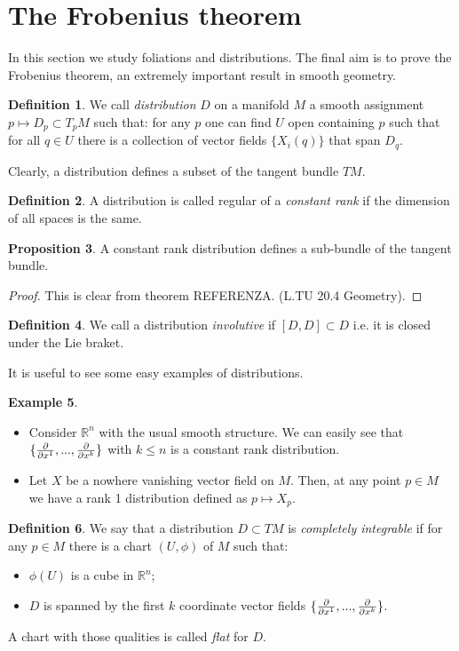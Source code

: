 \documentclass[12pt,a4paper]{report}
\theoremstyle{definition}
\newtheorem{Def}{Definition}[chapter]
\theoremstyle{Theorem}
\newtheorem{Prop}[Def]{Proposition}
\theoremstyle{definition}
\newtheorem{Ex}[Def]{Example}
\theoremstyle{definition}
\begin{document}
		\section{The Frobenius theorem}
		In this section we study foliations and distributions. The final aim is to prove the Frobenius theorem, an extremely important result in smooth geometry.
		\begin{Def}
			We call \textit{distribution} $D$ on a manifold $M$ a smooth assignment $p\mapsto D_p\subset T_pM$ such that: for any $p$ one can find $U$ open containing $p$ such that for all $q\in U$ there is a collection of vector fields $\{X_i(q)\}$ that span $D_q$.
		\end{Def}
		Clearly, a distribution defines a subset of the tangent bundle $TM$.
		\begin{Def}
			A distribution is called regular of a \textit{constant rank} if the dimension of all spaces is the same. 
		\end{Def}
		\begin{Prop}
			A constant rank distribution defines a sub-bundle of the tangent bundle.
		\end{Prop}
		\begin{proof}
			This is clear from theorem REFERENZA. (L.TU 20.4 Geometry).
		\end{proof}
		\begin{Def}
			We call a distribution \textit{involutive} if $[D,D]\subset D$ i.e. it is closed under the Lie braket.
		\end{Def}
		It is useful to see some easy examples of distributions.
		\begin{Ex}
			\begin{itemize}
				\item Consider $\mathbb{R}^n$ with the usual smooth structure. We can easily see that $\{{\partial\over \partial x^1},...,{\partial\over \partial x^k}\}$ with $k\leq n$ is a constant rank distribution.
				\item Let $X$ be a nowhere vanishing vector field on $M$. Then, at any point $p\in M$ we have a rank 1 distribution defined as $p\mapsto X_p$.
			\end{itemize}
		\end{Ex}
		\begin{Def}
			We say that a distribution $D\subset TM$ is \textit{completely integrable} if for any $p\in M$ there is a chart $(U,\phi)$ of $M$ such that:
			\begin{itemize}
				\item $\phi(U)$ is a cube in $\mathbb{R}^n$;
				\item $D$ is spanned by the first $k$ coordinate vector fields $\{{\partial\over \partial x^1},...,{\partial\over \partial x^k}\}$.
			\end{itemize}
			A chart with those qualities is called \textit{flat} for $D$.
 		\end{Def}
\end{document}
